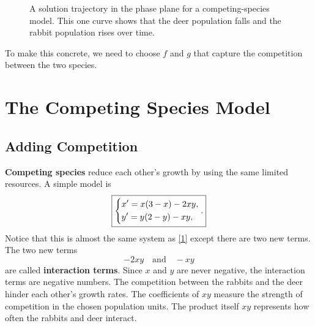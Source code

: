 \documentclass[10pt,letterpaper]{article}
\begin{document}
\begin{figure}[H]
\centering
{}
\caption{A solution trajectory in the phase plane
for a competing-species model. This one curve shows
that the deer population falls and the rabbit population rises over time.}
\label{fig:competing-species-trajectory}
\end{figure}

To make this concrete, we need to choose $f$ and $g$ that capture the competition between the two species.


\section{The Competing Species Model}

\subsection{Adding Competition}
\textbf{Competing species} reduce each other's growth by using the same
limited resources. A simple model is
\[
\boxed{\begin{dcases}
x'=x(3-x)-2 xy,\\
y'=y(2-y)- xy,
\end{dcases}.}
\]
Notice that this is almost the same system as \eqref{1} except there are two new terms. 
The two new terms 
$$
    -2 xy \quad \text{and}\quad - xy
$$
are called \textbf{interaction terms}. Since $x$ and $y$ are never negative, the interaction terms are negative numbers. The competition between the rabbits and the deer hinder each other's growth rates. The coefficients of $xy$ measure the strength of competition
in the chosen population units. The product itself $xy$ represents how often the rabbits and deer interact.
\end{document}
